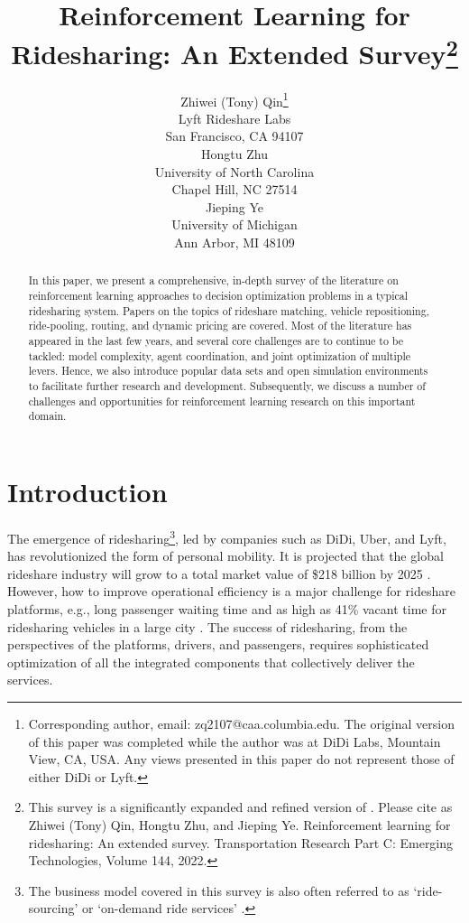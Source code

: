 \documentclass{article}
\title{Reinforcement Learning for Ridesharing: An Extended Survey\thanks{This survey is a significantly expanded and refined version of \citep{qin2021reinforcement}. Please cite as Zhiwei (Tony) Qin, Hongtu Zhu, and Jieping Ye. Reinforcement learning for ridesharing: An extended survey. Transportation Research Part C: Emerging Technologies,
Volume 144,
2022.}}
\author{%
  Zhiwei (Tony) Qin\thanks{Corresponding author, email: zq2107@caa.columbia.edu. The original version of this paper was completed while the author was at DiDi Labs, Mountain View, CA, USA. Any views presented in this paper do not represent those of either DiDi or Lyft.} \\
  Lyft Rideshare Labs \\
  San Francisco, CA 94107 \\
   \And
   Hongtu Zhu \\
   University of North Carolina \\
   Chapel Hill, NC 27514 \\
   \AND
   Jieping Ye \\
   University of Michigan \\
   Ann Arbor, MI 48109 \\
}
\newcommand{\tq}[1]{\textcolor{red}{#1}}
\begin{document}
\maketitle

\begin{abstract}
In this paper, we present a comprehensive, in-depth survey of the literature on reinforcement learning approaches to decision optimization problems in a typical ridesharing system. Papers on the topics of rideshare matching, vehicle repositioning, ride-pooling, routing, and dynamic pricing are covered. Most of the literature has appeared in the last few years, and several core challenges are to continue to be tackled: model complexity, agent coordination, and joint optimization of multiple levers.
Hence, we also introduce popular data sets and open simulation environments to facilitate further research and development. Subsequently, we discuss a number of challenges and opportunities for reinforcement learning research on this important domain.
\end{abstract}

\section{Introduction}
The emergence of ridesharing\footnote{The business model covered in this survey is also often referred to as `ride-sourcing' or `on-demand ride services' \citep{wang2019ridesourcing}.}, led by companies such as DiDi, Uber, and Lyft, has revolutionized the form of personal mobility. It is projected that the global rideshare industry will grow to a total market value of \$218 billion by 2025 \citep{markets2018ridesharevol}. 
However, how to improve operational efficiency is a major challenge for rideshare platforms, e.g., long passenger waiting time \citep{wtop2019wait} and as high as 41\% vacant time for ridesharing vehicles in a large city \citep{wsj2020vacant}. The success of ridesharing, from the perspectives of the platforms, drivers, and passengers, requires sophisticated optimization of all the integrated components that collectively deliver the services.
\end{document}
